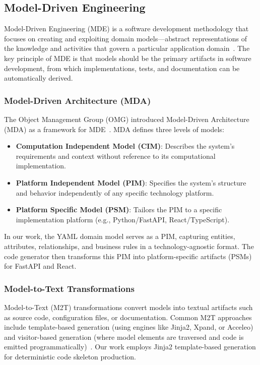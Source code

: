 \documentclass[11pt,a4paper]{article}
\begin{document}
\subsection{Model-Driven Engineering}

Model-Driven Engineering (MDE) is a software development methodology that focuses on creating and exploiting domain models---abstract representations of the knowledge and activities that govern a particular application domain~\cite{schmidt2006model}. The key principle of MDE is that models should be the primary artifacts in software development, from which implementations, tests, and documentation can be automatically derived.

\subsubsection{Model-Driven Architecture (MDA)}

The Object Management Group (OMG) introduced Model-Driven Architecture (MDA) as a framework for MDE~\cite{omg2003mda}. MDA defines three levels of models:

\begin{itemize}
    \item \textbf{Computation Independent Model (CIM)}: Describes the system's requirements and context without reference to its computational implementation.
    \item \textbf{Platform Independent Model (PIM)}: Specifies the system's structure and behavior independently of any specific technology platform.
    \item \textbf{Platform Specific Model (PSM)}: Tailors the PIM to a specific implementation platform (e.g., Python/FastAPI, React/TypeScript).
\end{itemize}

In our work, the YAML domain model serves as a PIM, capturing entities, attributes, relationships, and business rules in a technology-agnostic format. The code generator then transforms this PIM into platform-specific artifacts (PSMs) for FastAPI and React.

\subsubsection{Model-to-Text Transformations}

Model-to-Text (M2T) transformations convert models into textual artifacts such as source code, configuration files, or documentation. Common M2T approaches include template-based generation (using engines like Jinja2, Xpand, or Acceleo) and visitor-based generation (where model elements are traversed and code is emitted programmatically)~\cite{czarnecki2006generative}. Our work employs Jinja2 template-based generation for deterministic code skeleton production.
\end{document}
